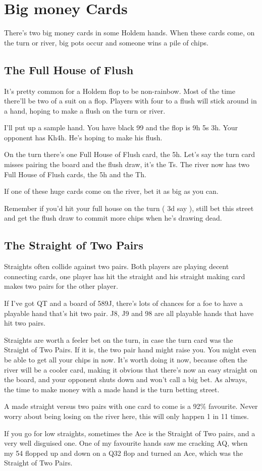 \chapter{Big money Cards}


There's two big money cards in some Holdem hands. When these cards come,
on the turn or river, big pots occur and someone wins a pile of chips.

\section{The Full House of Flush}

It's pretty common for a Holdem flop to be non-rainbow. Most of the time
there'll be two of a suit on a flop. Players with four to a flush will
stick around in a hand, hoping to make a flush on the turn or river.

I'll put up a sample hand. You have black 99 and the flop is
9h 5s 3h. Your opponent has Kh4h. He's hoping to make his flush.

On the turn there's one Full House of Flush card, the 5h. Let's say
the turn card misses pairing the board and the flush draw, it's
the Ts. The river now has two Full House of Flush cards, the 5h and
the Th.

If one of these huge cards come on the river, bet it as big as you can.

Remember if you'd hit your full house on the turn ( 3d say ), still bet
this street and get the flush draw to commit more chips when he's drawing
dead.

\section{The Straight of Two Pairs}

Straights often collide against two pairs. Both players are playing
decent connecting cards, one player has hit the straight and his straight
making card makes two pairs for the other player.

If I've got QT and a board of 589J, there's lots of chances for a foe
to have a playable hand that's hit two pair. J8, J9 and 98 are all playable
hands that have hit two pairs. 

Straights are worth a feeler bet on the turn, in case the turn card was
the Straight of Two Pairs. If it is, the two pair hand might raise
you. You might even be able to get all your chips
in now. It's worth doing it now, because often the river will be a cooler
card, making it obvious that there's now an easy straight on the board,
and your opponent shuts down and won't call a big bet. As always, the
time to make money with a made hand is the turn betting street.

A made straight versus two pairs with one card to come is a 92\% favourite.
Never worry about being losing on the river here, this will only happen
1 in 11 times. 

If you go for low straights, sometimes the Ace is the Straight of Two pairs,
and a very well disguised one. One of my favourite hands saw me
cracking AQ, when my 54 flopped up and down on a Q32 flop and turned
an Ace, which was the Straight of Two Pairs.
